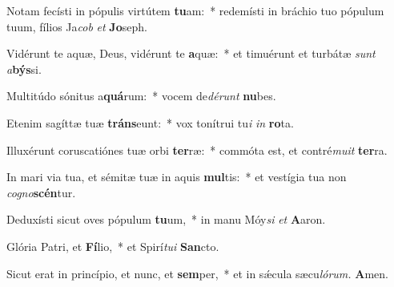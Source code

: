 \item Notam fecísti in pópulis virtútem \textbf{tu}am:~* redemísti in bráchio tuo pópulum tuum, fílios Ja\hspace{0.03em}\textit{cob} \textit{et} \textbf{Jo}seph.
\item Vidérunt te aquæ, Deus, vidérunt te \textbf{a}quæ:~* et timuérunt et turbátæ \textit{sunt} \textit{a}\textbf{býs}si.
\item Multitúdo sónitus a\textbf{quá}rum:~* vocem de\hspace{0.03em}\textit{dérunt} \textbf{nu}bes.
\item Etenim sagíttæ tuæ \textbf{tráns}eunt:~* vox tonítrui tu\textit{i} \textit{in} \textbf{ro}ta.
\item Illuxérunt coruscatiónes tuæ orbi \textbf{ter}ræ:~* commóta est, et contré\textit{muit} \textbf{ter}ra.
\item In mari via tua, et sémitæ tuæ in aquis \textbf{mul}tis:~* et vestígia tua non \medspace \textit{cogno}\hspace{0.03em}\textbf{scén}tur.
\item Deduxísti sicut oves pópulum \textbf{tu}um,~* in manu Móy\textit{si} \textit{et} \textbf{A}aron.
\item Glória Patri, et \textbf{Fí}lio,~* et Spirí\hspace{0.03em}\textit{tui} \textbf{San}cto.
\item Sicut erat in princípio, et nunc, et \textbf{sem}per,~* et in sǽcula sæcu\hspace{0.03em}\textit{lórum.} \textbf{A}men.

